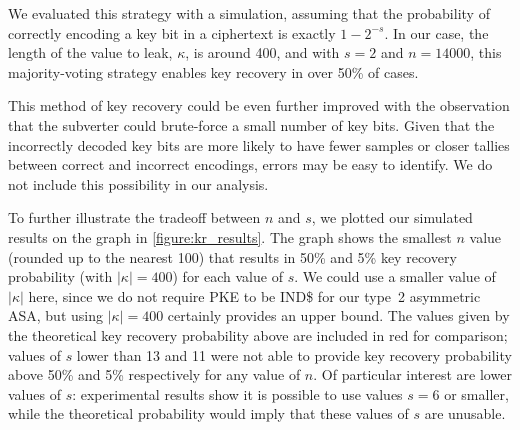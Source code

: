 \else
We evaluated this strategy with a simulation, assuming that the probability of correctly encoding a key bit in a ciphertext is exactly $1-2^{-s}$. In our case, the length of the value to leak, $\kappa$, is around 400, and with $s=2$ and $n=14000$, this majority-voting strategy enables key recovery in over 50\% of cases.
\fi

This method of key recovery could be even further improved with the observation that the subverter could brute-force a small number of key bits. Given that the incorrectly decoded key bits are more likely to have fewer samples or closer tallies between correct and incorrect encodings, errors may be easy to identify. We do not include this possibility in our analysis.

To further illustrate the tradeoff between $n$ and $s$, we plotted our simulated results on the graph in \autoref{figure:kr_results}. The graph shows the smallest $n$ value (rounded up to the nearest 100) that results in 50\% and 5\% key recovery probability (with $|\kappa|=400$) for each value of $s$. We could use a smaller value of $|\kappa|$ here, since we do not require \textsf{PKE} to be IND\$ for our type~2 asymmetric ASA, but using $|\kappa|=400$ certainly provides an upper bound. The values given by the theoretical key recovery probability above are included in red for comparison; values of $s$ lower than 13 and 11 were not able to provide key recovery probability above 50\% and 5\% respectively for any value of $n$. Of particular interest are lower values of $s$: experimental results show it is possible to use values $s=6$ or smaller, while the theoretical probability would imply that these values of $s$ are unusable.

